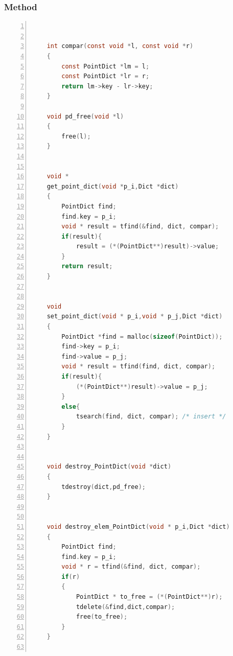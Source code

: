 \documentclass[twoside,12pt, a4paper]{report}
\begin{document}
\subsubsection{Method}

\begin{lstlisting}[language=C, % Spécifie le langage du code
	caption={Point Map Methods}, % Légende du listing
	label=lst:pmap_c, % Étiquette pour référencer le listing
	numbers=left, 
	numberstyle=\tiny\color{gray}, 
	stepnumber=1, 
	frame=single,
	breaklines=true, 
	postbreak=\mbox{\textcolor{red}{$\hookrightarrow$}\space},
	showstringspaces=false 
	]
	
	
	int compar(const void *l, const void *r)
	{
		const PointDict *lm = l;
		const PointDict *lr = r;
		return lm->key - lr->key;
	}
	
	void pd_free(void *l)
	{
		free(l);
	}
	
	
	void *
	get_point_dict(void *p_i,Dict *dict)
	{
		PointDict find;
		find.key = p_i;
		void * result = tfind(&find, dict, compar);
		if(result){
			result = (*(PointDict**)result)->value;
		}
		return result;
	}
	
	
	void
	set_point_dict(void * p_i,void * p_j,Dict *dict)
	{
		PointDict *find = malloc(sizeof(PointDict));
		find->key = p_i;
		find->value = p_j;
		void * result = tfind(find, dict, compar);
		if(result){
			(*(PointDict**)result)->value = p_j;
		}
		else{
			tsearch(find, dict, compar); /* insert */
		}
	}
	
	
	void destroy_PointDict(void *dict)
	{
		tdestroy(dict,pd_free);
	}
	
	
	void destroy_elem_PointDict(void * p_i,Dict *dict)
	{
		PointDict find;
		find.key = p_i;
		void * r = tfind(&find, dict, compar);
		if(r)
		{
			PointDict * to_free = (*(PointDict**)r);
			tdelete(&find,dict,compar);
			free(to_free);
		}
	}
	
\end{lstlisting}
\end{document}

